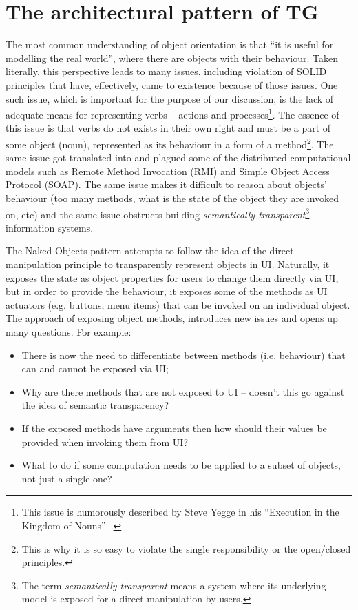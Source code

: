 \documentclass[a4paper,12pt,oneside,openright,final]{memoir} %
\begin{document}
\section*{The architectural pattern of TG}
	The most common understanding of object orientation is that ``it is useful for modelling the real world'', where there are objects with their behaviour.
	Taken literally, this perspective leads to many issues, including violation of SOLID principles that have, effectively, came to existence because of those issues.
	One such issue, which is important for the purpose of our discussion, is the lack of adequate means for representing verbs -- actions and processes\footnote{This issue is humorously  described by Steve Yegge in his ``Execution in the Kingdom of Nouns''~\cite{yegge2006}.}.
	The essence of this issue is that verbs do not exists in their own right and must be a part of some object (noun), represented as its behaviour in a form of a method\footnote{This is why it is so easy to violate the single responsibility or the open/closed principles.}.
	The same issue got translated into and plagued some of the distributed computational models such as Remote Method Invocation (RMI) and Simple Object Access Protocol (SOAP).
	The same issue makes it difficult to reason about objects' behaviour (too many methods, what is the state of the object they are invoked on, etc) and the same issue obstructs building \emph{semantically transparent}\footnote{The term \emph{semantically transparent} means a system where its underlying model is exposed for a direct manipulation by users.} information systems.
	
	The Naked Objects pattern attempts to follow the idea of the direct manipulation principle to transparently represent objects in UI.
	Naturally, it exposes the state as object properties for users to change them directly via UI, but in order to provide the behaviour, it exposes some of the methods as UI actuators (e.g. buttons, menu items) that can be invoked on an individual object.
	The approach of exposing object methods, introduces new issues and opens up many questions.
	For example:
  	\begin{itemize}
    	\item There is now the need to differentiate between methods (i.e. behaviour) that can and cannot be exposed via UI;
		\item Why are there methods that are not exposed to UI -- doesn't this go against the idea of semantic transparency?
		\item If the exposed methods have arguments then how should their values be provided when invoking them from UI?
		\item What to do if some computation needs to be applied to a subset of objects, not just a single one?
	\end{itemize}
	
\end{document}
